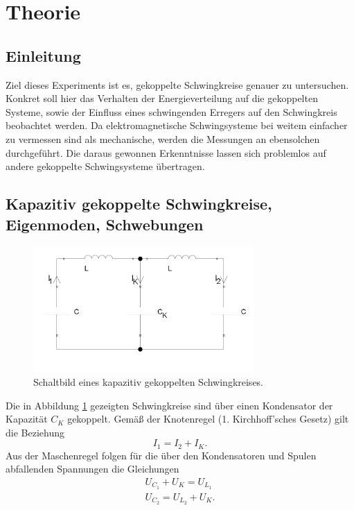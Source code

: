 \section{Theorie}
\label{sec:Theorie}

\subsection{Einleitung}
Ziel dieses Experiments ist es, gekoppelte Schwingkreise genauer zu untersuchen. 
Konkret soll hier das Verhalten der Energieverteilung auf die gekoppelten Systeme, sowie der Einfluss eines schwingenden 
Erregers auf den Schwingkreis beobachtet werden.
Da elektromagnetische Schwingsysteme bei weitem einfacher zu vermessen sind als mechanische, werden die 
Messungen an ebensolchen durchgeführt. 
Die daraus gewonnen Erkenntnisse lassen sich problemlos auf andere gekoppelte Schwingsysteme übertragen. 

\subsection{Kapazitiv gekoppelte Schwingkreise, Eigenmoden, Schwebungen}
\begin{figure}
    \centering
    \includegraphics[width=0.75\textwidth]{plots/allg_gekopp_schwingkreis.png}
    \caption{Schaltbild eines kapazitiv gekoppelten Schwingkreises.}
    \label{fig:kap_gekopp}
\end{figure}
Die in Abbildung \ref{fig:kap_gekopp} gezeigten Schwingkreise sind über einen Kondensator der Kapazität $C_K$ gekoppelt. 
Gemäß der Knotenregel (1. Kirchhoff'sches Gesetz) gilt die Beziehung
\begin{equation}
    I_1 = I_2 + I_K .
    \label{eqn:strom}
\end{equation}
Aus der Maschenregel folgen für die über den Kondensatoren und Spulen abfallenden Spannungen die Gleichungen 
\begin{align} %
    U_{C_1} + U_K = U_{L_1} 
    \label{eqn:masche1} \\
    U_{C_2} = U_{L_2} + U_K .
    \label{eqn:masche2} 
\end{align}

